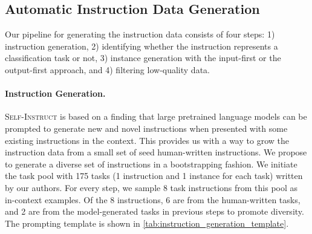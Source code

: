 \documentclass[11pt]{article}
\newcommand{\yizhong}[1]{\textcolor{violet}{[YZ: #1]}}
\newcommand{\daniel}[1]{\textcolor{blue}{[DK: #1]}}
\newcommand{\nascomment}[1]{\textcolor{blue}{\textbf{[#1 -- \textsc{nas}]}}}
\newcommand{\name}{\textsc{Self-Instruct}}
\begin{document}

\subsection{Automatic Instruction Data Generation}
\label{subsec:data-generation}

Our pipeline for generating the instruction data consists of four steps: 1) instruction generation, 2) identifying whether the instruction represents a classification task or not, 3) instance generation with the input-first or the output-first approach, and 4) filtering low-quality data.

\paragraph{Instruction Generation.}
\name{} is based on a finding that large pretrained language models can be prompted to generate new and novel instructions when presented with some existing instructions in the context. This provides us with a way to grow the instruction data from a small set of seed human-written instructions. 
We propose to generate a diverse set of instructions in a bootstrapping fashion. We initiate the task pool with 175 tasks (1 instruction and 1 instance for each task) written by our authors. For every step, we sample 8 task instructions from this pool as in-context examples.
Of the 8 instructions, 6 are from the human-written tasks,
and 2 are from the model-generated tasks in previous steps to promote diversity. 
The prompting template is shown in \autoref{tab:instruction_generation_template}.
\end{document}
